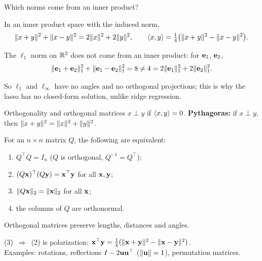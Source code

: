 \documentclass[aspectratio=1610,11pt]{beamer}
\begin{document}

\begin{frame}{Which norms come from an inner product?}
    \begin{proposition}
        In an inner product space with the induced norm,
        \[\lVert x + y \rVert^2 + \lVert x - y \rVert^2 = 2\lVert x \rVert^2 + 2\lVert y \rVert^2, \qquad \langle x, y \rangle = \tfrac{1}{4}\big(\lVert x + y \rVert^2 - \lVert x - y \rVert^2\big).\]
    \end{proposition}
    \begin{example}
        The $\ell_1$ norm on $\mathbb{R}^2$ does not come from an inner product: for $\mathbf{e}_1$, $\mathbf{e}_2$,
        \[\lVert \mathbf{e}_1 + \mathbf{e}_2 \rVert_1^2 + \lVert \mathbf{e}_1 - \mathbf{e}_2 \rVert_1^2 = 8 \neq 4 = 2\lVert \mathbf{e}_1 \rVert_1^2 + 2\lVert \mathbf{e}_2 \rVert_1^2.\]
    \end{example}
    \small So $\ell_1$ and $\ell_\infty$ have no angles and no orthogonal projections; this is why the lasso has no closed-form solution, unlike ridge regression.
\end{frame}


\begin{frame}{Orthogonality and orthogonal matrices}
    \small
    $x \perp y$ if $\langle x, y \rangle = 0$. \quad \textbf{Pythagoras:} if $x \perp y$, then $\lVert x + y \rVert^2 = \lVert x \rVert^2 + \lVert y \rVert^2$.
    \begin{theorem}
        For an $n \times n$ matrix $Q$, the following are equivalent:
        \begin{enumerate}
            \item $Q^\top Q = I_n$ ($Q$ is orthogonal, $Q^{-1} = Q^\top$);
            \item $(Q\mathbf{x})^\top(Q\mathbf{y}) = \mathbf{x}^\top\mathbf{y}$ for all $\mathbf{x}, \mathbf{y}$;
            \item $\lVert Q\mathbf{x} \rVert_2 = \lVert \mathbf{x} \rVert_2$ for all $\mathbf{x}$;
            \item the columns of $Q$ are orthonormal.
        \end{enumerate}
        Orthogonal matrices preserve lengths, distances and angles.
    \end{theorem}
    (3)~$\Rightarrow$~(2) is polarization: $\mathbf{x}^\top\mathbf{y} = \frac{1}{4}(\lVert \mathbf{x} + \mathbf{y} \rVert^2 - \lVert \mathbf{x} - \mathbf{y} \rVert^2)$. \\
    Examples: rotations, reflections $I - 2\mathbf{u}\mathbf{u}^\top$ ($\lVert \mathbf{u} \rVert = 1$), permutation matrices.
\end{frame}
\end{document}
